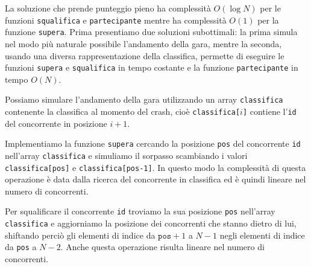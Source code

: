 \newpage
\setcounter{figure}{0}


\pagecolor{backcolor}



\newcommand{\cell}[2]{\mbox{$(#1,#2)$}}

\newcommand{\mon}[1]{$\mathtt{#1}$}

\Solution
La soluzione che prende punteggio pieno ha complessità $O(\log N)$ per le funzioni \texttt{squalifica} e \texttt{partecipante} mentre ha complessità $O(1)$ per la funzione \texttt{supera}. Prima presentiamo due soluzioni subottimali: la prima simula nel modo più naturale possibile l'andamento della gara, mentre la seconda, usando una diversa rappresentazione della classifica, permette di eseguire le funzioni \texttt{supera} e \texttt{squalifica} in tempo costante e la funzione \texttt{partecipante} in tempo $O(N)$.

\Simulazione
Possiamo simulare l'andamento della gara utilizzando un array \texttt{classifica} contenente la classifica al momento del crash, cioè \texttt{classifica[$i$]} contiene l'\texttt{id} del concorrente in posizione $i+1$. 

Implementiamo la funzione \texttt{supera} cercando la posizione \texttt{pos} del concorrente \texttt{id} nell'array \texttt{classifica} e simuliamo il sorpasso scambiando i valori \texttt{classifica[pos]} e \texttt{classifica[pos-1]}. In questo modo la complessità di questa operazione è data dalla ricerca del concorrente in classifica ed è quindi lineare nel numero di concorrenti.

Per squalificare il concorrente \texttt{id} troviamo la sua posizione \texttt{pos} nell'array \texttt{classifica} e aggiorniamo la posizione dei concorrenti che stanno dietro di lui, shiftando perciò gli elementi di indice da $\texttt{pos}+1$ a $N-1$ negli elementi di indice da \texttt{pos} a $N-2$.
Anche questa operazione risulta lineare nel numero di concorrenti.

